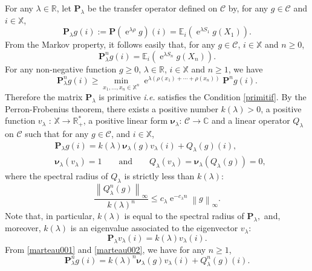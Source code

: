 \documentclass[12pt]{amsart}
\theoremstyle{definition}
\numberwithin{equation}{section}
\newcommand*{\norm}[1]{\left\lVert#1\right\rVert}
\def\bb#1{\mathbb{#1}}
\def\bs#1{\boldsymbol{#1}}
\def\bf#1{\mathbf{#1}}
\def\scr#1{\mathscr{#1}}
\def\geq{\geqslant}
\def\leq{\leqslant}
\renewcommand\ll{\lambda}
\DeclareMathOperator{\e}{e}
\begin{document}
For any $\ll \in \bb R$, let $\bf P_{\ll}$ be the transfer operator defined on $\scr C$ by, for any $g \in \scr C$ and $i \in \bb X$,
\begin{equation}
	\label{ocean}
	\bf P_{\ll}g(i) := \bf P\left( \e^{\ll \rho} g \right)(i) = \bb E_i \left( \e^{\ll S_1} g(X_1) \right).
\end{equation}
From the Markov property, it follows easily that, for any $g \in \scr C$, $i \in \bb X$ and $n \geq 0$,
\begin{equation}
	\label{balancoire}
	\bf P_{\ll}^n g(i) = \bb E_i \left( \e^{\ll S_n} g(X_n) \right).
\end{equation}
For any non-negative function $g \geq 0$, $\ll \in \bb R$, $i\in \bb X$ and $n \geq 1$, we have
\begin{equation}
\label{pinson}
\bf P_{\ll}^n g(i) \geq \min_{x_1, \dots, x_n \in \bb X^n} \e^{\ll \left(\rho(x_1) + \cdots + \rho(x_n)\right)} \bf P^n g(i).
\end{equation}
Therefore the matrix $\bf P_{\ll}$ is primitive \textit{i.e.} satisfies the Condition \ref{primitif}. By the Perron-Frobenius theorem, there exists a positive number $k(\ll) > 0$, a positive function $v_{\ll}$ : $\bb X \to \bb R_+^*$, a positive linear form $\bs \nu_{\ll}$: $\scr C \to \bb C$ and  a linear operator $Q_{\ll}$ on $\scr C$ such that for any $g \in \scr C$, and $i \in \bb X$,
\begin{align}
	\label{marteau001}
	&\bf P_{\ll} g(i) = k(\ll)\bs \nu_{\ll}(g) v_{\ll}(i) + Q_{\ll}(g)(i), \\
	\label{marteau002}
	&\bs \nu_{\ll}\left( v_{\ll} \right) = 1 \qquad \text{and} \qquad Q_{\ll} \left(v_{\ll}\right) = \bs \nu_{\ll} \left(Q_{\ll}(g) \right) = 0,
\end{align}
where the spectral radius of $Q_{\ll}$ is strictly less than $k(\ll)$:
\begin{equation}
	\label{torrent}
\frac{\norm{Q_{\ll}^n(g)}_{\infty}}{k(\ll)^n} \leq c_{\ll} \e^{-c_{\ll}n} \norm{g}_{\infty}.
\end{equation}
Note that, in particular, $k(\ll)$ is equal to the spectral radius of $\bf P_{\ll},$ and,
moreover, $k(\ll)$  is an eigenvalue associated to the eigenvector $v_{\ll}$:
\begin{equation}
	\label{totem}
	\bf P_{\ll} v_{\ll} (i) = k(\ll) v_{\ll}(i).
\end{equation}
From \eqref{marteau001} and \eqref{marteau002}, we have for any $n \geq 1$,
\begin{equation}
	\label{psychedelique}
	\bf P_{\ll}^n g(i) = k(\ll)^n \bs \nu_{\ll}(g) v_{\ll}(i) + Q_{\ll}^n(g)(i).
\end{equation}
\end{document}
